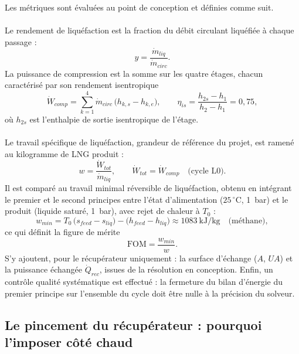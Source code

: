 Les métriques sont évaluées au point de conception et définies comme suit.
\\
\\
Le rendement de liquéfaction est la fraction du débit circulant liquéfiée à
chaque passage :
\begin{equation}
  y = \frac{\dot m_{liq}}{\dot m_{circ}} .
  \label{eq:yield}
\end{equation}
La puissance de compression est la somme sur les quatre étages, chacun
caractérisé par son rendement isentropique
\begin{equation}
  \dot W_{comp} = \sum_{k=1}^{4} \dot m_{circ}\,\bigl(h_{k,s} - h_{k,e}\bigr),
  \qquad
  \eta_{is} = \frac{h_{2s} - h_1}{h_2 - h_1} = 0{,}75 ,
  \label{eq:comp}
\end{equation}
où $h_{2s}$ est l'enthalpie de sortie isentropique de l'étage. 
\\
\\
Le travail spécifique de liquéfaction, grandeur de référence du projet, est ramené au
kilogramme de LNG produit :
\begin{equation}
  w = \frac{\dot W_{tot}}{\dot m_{liq}},
  \qquad
  \dot W_{tot} = \dot W_{comp} \quad \text{(cycle L0)} .
  \label{eq:w}
\end{equation}
Il est comparé au travail minimal réversible de liquéfaction, obtenu en
intégrant le premier et le second principes entre l'état d'alimentation
($25\,^\circ$C, 1~bar) et le produit (liquide saturé, 1~bar), avec rejet de
chaleur à $T_0$ :
\begin{equation}
  w_{min} = T_0\,\bigl(s_{feed} - s_{liq}\bigr)
          - \bigl(h_{feed} - h_{liq}\bigr)
          \approx 1083~\text{kJ/kg} \quad \text{(méthane)} ,
  \label{eq:wmin}
\end{equation}
ce qui définit la figure de mérite
\begin{equation}
  \mathrm{FOM} = \frac{w_{min}}{w} .
  \label{eq:fom}
\end{equation}
S'y ajoutent, pour le récupérateur uniquement : la surface d'échange
($A$, $UA$) et la puissance échangée $\dot Q_{rec}$, issues de la
résolution en conception. Enfin, un contrôle qualité systématique est
effectué : la fermeture du bilan d'énergie du premier principe sur l'ensemble
du cycle doit être nulle à la précision du solveur.

\subsection{Le pincement du récupérateur : pourquoi l'imposer côté chaud}
\label{sec:pinch_L0}


